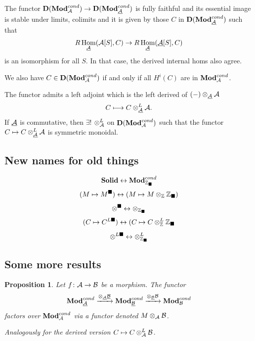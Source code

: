 \documentclass[A4paper, british, reqno]{amsart}
\theoremstyle{darkgreentheorem}
\newtheorem{prop}[thm]{Proposition}
\theoremstyle{darkbluedefinition}
\theoremstyle{darkredexample}
\theoremstyle{remark}
\DeclareMathOperator{\Hom}{Hom}
\newcommand{\Solid}{\mathbf{Solid}}
\newcommand{\1}{\mathbbm{1}}
\renewcommand{\u}[1]{\underline{#1}}
\newcommand{\ot}{\otimes}
\newcommand{\solid}{^{\blacksquare}}
\newcommand{\dsolid}{^{L\blacksquare}}
\newcommand{\usolid}{_{\blacksquare}}
\begin{document}
The functor $\D(\Mod_{\calA}^{cond})\to \D(\Mod_{\u{\calA}}^{cond})$ is fully faithful and its essential image is stable under limits, colimits and it is given by those $C$ in $\D(\Mod_{\u{\calA}}^{cond})$ such that
\[ R\Hom_{\u{\calA}}(\calA[S],C)\to R\Hom_{\u{\calA}}(\u{\calA}[S],C) \]
is an isomorphism for all $S$.
In that case, the derived internal homs also agree.

We also have $C\in \mathbf{D}(\mathbf{Mod}_{\mathcal{A}}^{cond})$ if and only if all $H^{i}(C)$ are in $\mathbf{Mod}_{\mathcal{A}}^{cond}$.

The functor admits a left adjoint which is the left derived of $(-)\ot_{\u{\calA}}\calA$
\[ C\longmapsto C\ot_{\u{\calA}}^{L}\calA. \]
If $\u{\calA}$ is commutative, then $\exists !$ $\ot_{\calA}^{L}$ on $\mathbf{D}(\mathbf{Mod}_{\mathcal{A}}^{cond})$ such that the functor $C\mapsto C\ot_{\u{\calA}}^{L}\calA$ is symmetric monoidal.

\subsection{New names for old things}

\[ \Solid \leftrightarrow \Mod_{\Z\usolid}^{cond} \]
\[ (M\mapsto M\solid) \leftrightarrow (M\mapsto M\ot_{\Z}\Z\usolid) \]
\[ \ot\solid \leftrightarrow \ot_{\Z\usolid} \]
\[ (C\mapsto C\dsolid) \leftrightarrow (C\mapsto C\ot_{\Z}^{L}\Z\usolid \]
\[ \ot\dsolid \leftrightarrow \ot_{\Z\usolid}^{L} \]

\subsection{Some more results}

\begin{prop}
    Let $f\colon \mathcal{A}\to \mathcal{B}$ be a morphism.
    The functor
    \[ \Mod_{\u{\calA}}^{cond}\xrightarrow{\ot_{\u{\calA}}\u{\calB}} \Mod_{\u{\calB}}^{cond}\xrightarrow{\ot_{\u{\calB}}\calB} \Mod_{\calB}^{cond} \]
    factors over $\mathbf{Mod}_{\mathcal{A}}^{cond}$ via a functor denoted $M\ot_{\calA}\calB$.

    Analogously for the derived version $C\mapsto C\ot_{\calA}^{L}\calB$.
\end{prop}
\end{document}
